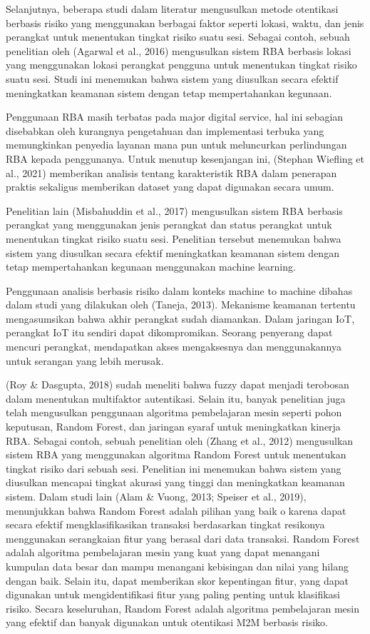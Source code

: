 Selanjutnya, beberapa studi dalam literatur mengusulkan metode otentikasi berbasis risiko yang menggunakan berbagai faktor seperti lokasi, waktu, dan jenis perangkat untuk menentukan tingkat risiko suatu sesi. Sebagai contoh, sebuah penelitian oleh (Agarwal et al., 2016) mengusulkan sistem RBA berbasis lokasi yang menggunakan lokasi perangkat pengguna untuk menentukan tingkat risiko suatu sesi. Studi ini menemukan bahwa sistem yang diusulkan secara efektif meningkatkan keamanan sistem dengan tetap mempertahankan kegunaan.

Penggunaan RBA masih terbatas pada major digital service, hal ini sebagian disebabkan oleh kurangnya pengetahuan dan implementasi terbuka yang memungkinkan penyedia layanan mana pun untuk meluncurkan perlindungan RBA kepada penggunanya. Untuk menutup kesenjangan ini, (Stephan Wiefling et al., 2021) memberikan analisis tentang karakteristik RBA dalam penerapan praktis sekaligus memberikan dataset yang dapat digunakan secara umum.

Penelitian lain (Misbahuddin et al., 2017) mengusulkan sistem RBA berbasis perangkat yang menggunakan jenis perangkat dan status perangkat untuk menentukan tingkat risiko suatu sesi. Penelitian tersebut menemukan bahwa sistem yang diusulkan secara efektif meningkatkan keamanan sistem dengan tetap mempertahankan kegunaan menggunakan machine learning.

Penggunaan analisis berbasis risiko dalam konteks machine to machine dibahas dalam studi yang dilakukan oleh (Taneja, 2013). Mekanisme keamanan tertentu mengasumsikan bahwa akhir perangkat sudah diamankan. Dalam jaringan IoT, perangkat IoT itu sendiri dapat dikompromikan. Seorang penyerang dapat mencuri perangkat, mendapatkan akses mengaksesnya dan menggunakannya untuk serangan yang lebih merusak.

(Roy \& Dasgupta, 2018) sudah meneliti bahwa fuzzy dapat menjadi terobosan dalam menentukan multifaktor autentikasi. Selain itu, banyak penelitian juga telah mengusulkan penggunaan algoritma pembelajaran mesin seperti pohon keputusan, Random Forest, dan jaringan syaraf untuk meningkatkan kinerja RBA. Sebagai contoh, sebuah penelitian oleh (Zhang et al., 2012) mengusulkan sistem RBA yang menggunakan algoritma Random Forest untuk menentukan tingkat risiko dari sebuah sesi. Penelitian ini menemukan bahwa sistem yang diusulkan mencapai tingkat akurasi yang tinggi dan meningkatkan keamanan sistem. Dalam studi lain (Alam \& Vuong, 2013; Speiser et al., 2019), menunjukkan bahwa Random Forest adalah pilihan yang baik o karena dapat secara efektif mengklasifikasikan transaksi berdasarkan tingkat resikonya menggunakan serangkaian fitur yang berasal dari data transaksi. Random Forest adalah algoritma pembelajaran mesin yang kuat yang dapat menangani kumpulan data besar dan mampu menangani kebisingan dan nilai yang hilang dengan baik. Selain itu, dapat memberikan skor kepentingan fitur, yang dapat digunakan untuk mengidentifikasi fitur yang paling penting untuk klasifikasi risiko. Secara keseluruhan, Random Forest adalah algoritma pembelajaran mesin yang efektif dan banyak digunakan untuk otentikasi M2M berbasis risiko.

